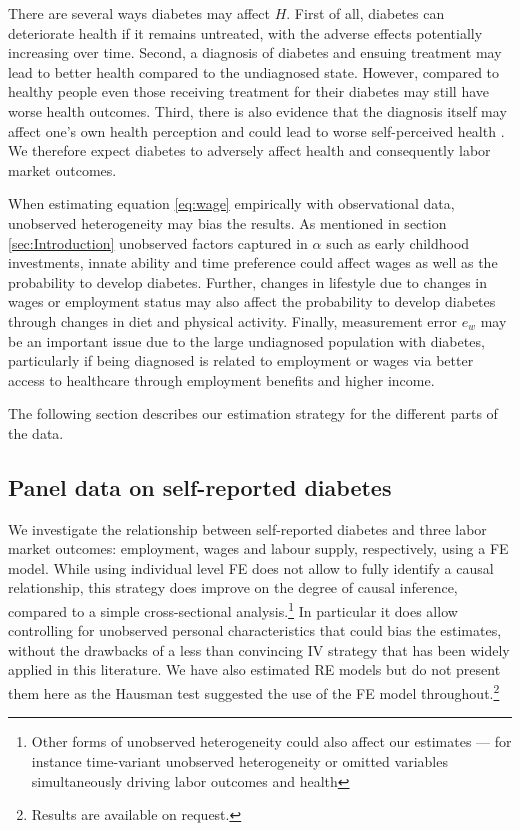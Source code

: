 \documentclass[12pt,english]{article}
\begin{document}
There are several ways diabetes may affect $H$. First of all, diabetes can deteriorate health if it remains untreated, with the adverse effects potentially increasing over time. Second, a diagnosis of diabetes and ensuing treatment may lead to better health compared to the undiagnosed state. However, compared to healthy people even those receiving treatment for their diabetes may still have worse health outcomes. Third, there is also evidence that the diagnosis itself may affect one's own health perception and could lead to worse self-perceived health \parencite{Thoolen2006}. We therefore expect diabetes to adversely affect health and consequently labor market outcomes.

When estimating equation  \ref{eq:wage} empirically with observational data, unobserved heterogeneity may bias the results. As mentioned in section  \ref{sec:Introduction} unobserved factors captured in $\alpha$ such as early childhood investments, innate ability and time preference could affect wages as well as the probability to develop diabetes. Further, changes in lifestyle due to changes in wages or employment status may also affect the probability to develop diabetes through changes in diet and physical activity. Finally, measurement error $e_w$ may be an important issue due to the large undiagnosed population with diabetes, particularly if being diagnosed is related to employment or wages via better access to healthcare through employment benefits and higher income.

The following section describes our estimation strategy for the different parts of the data.


\subsection{Panel data on self-reported diabetes}

We investigate the relationship between self-reported diabetes and three
labor market outcomes: employment, wages and labour supply, respectively, using a \ac{FE} model. While using individual level \ac{FE} does not allow to fully identify a causal relationship, this strategy does improve on the degree of causal inference, compared to a simple cross-sectional analysis.\footnote{Other forms of unobserved heterogeneity could also affect our estimates --- for instance time-variant unobserved heterogeneity or omitted variables simultaneously driving labor outcomes and health} In particular it does allow controlling for unobserved personal characteristics that could bias the estimates, without the drawbacks of a less than convincing \ac{IV} strategy that has been widely applied in this literature. We have also estimated \ac{RE} models but do not present them here as the Hausman test suggested the use of the \ac{FE} model throughout.\footnote{Results are available on request.}
\end{document}
